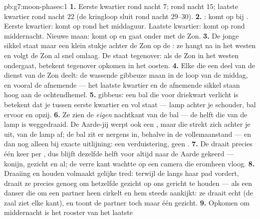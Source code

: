 \begin{solution}{pb:g7:moon-phases:1}
\textbf{1.} Eerste kwartier rond nacht $7$;  rond nacht
$15$; laatste kwartier rond nacht $22$ (de kringloop sluit rond nacht
$29$--$30$).
\textbf{2.} : komt op bij . Eerste
kwartier: komt op rond het middaguur. Laatste kwartier: komt op rond
middernacht. Nieuwe maan: komt op en gaat onder met de Zon.
\textbf{3.} De jonge sikkel staat maar een klein stukje achter de Zon
op de : ze hangt na  in het westen en volgt
de Zon al snel omlaag. De  staat tegenover: als de Zon in
het westen ondergaat, betekent tegenover opkomen in het oosten.
\textbf{4.} Elke  die een deel van de dienst van de Zon
deelt: de wassende gibbeuze maan in de loop van de middag, en vooral
de afnemende  --- het laatste kwartier en de
afnemende sikkel staan hoog aan de ochtendhemel.
\textbf{5.}  gibbeus: een bal die voor driekwart verlicht is
betekent dat je tussen eerste kwartier en vol staat --- lamp achter je
schouder, bal ervoor en opzij.
\textbf{6.} Ze zien de \emph{eigen} nachtkant van de bal --- de helft
die van de lamp is weggedraaid. De Aarde-jij werpt ook een
, maar die strekt zich achter je uit, van de lamp af; de bal
zit er nergens in, behalve in de vollemaanstand --- en dan nog alleen
bij exacte uitlijning: een verduistering, geen .
\textbf{7.} De  draait precies één keer per , dus
blijft dezelfde helft voor altijd naar de Aarde gekeerd --- konijn,
gezicht en al; de verre kant wachtte op een camera die eromheen vloog.
\textbf{8.} Draaiing en  houden volmaakt gelijke tred:
terwijl de  langs haar pad vordert, draait ze precies genoeg om
hetzelfde gezicht op ons gericht te houden --- als een danser die om
een partner heen cirkelt en hem steeds aankijkt: ze draait echt (de
zaal ziet elke kant), en toont de partner toch maar één gezicht.
\textbf{9.} Opkomen om middernacht is het rooster van het laatste

\end{solution}
